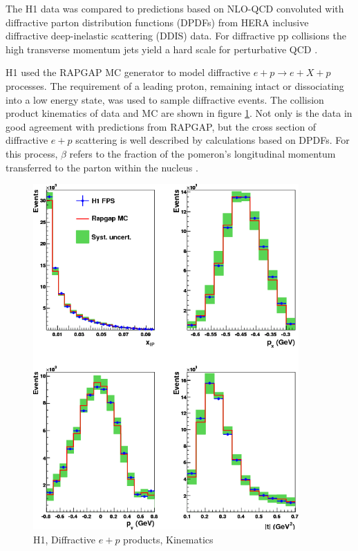 The H1 data was compared to predictions based on NLO-QCD convoluted with diffractive parton distribution functions (DPDFs) from HERA inclusive diffractive deep-inelastic scattering (DDIS) data. For diffractive pp collisions the high transverse momentum jets yield a hard scale for perturbative QCD \cite{Aaron:2010su}.

H1 used the RAPGAP MC generator to model diffractive $e+p \rightarrow e+X+p$ processes. The requirement of a leading proton, remaining intact or dissociating into a low energy state, was used to sample diffractive events. The collision product kinematics of data and MC are shown in figure \ref{fig:h1Kinematics}. Not only is the data in good agreement with predictions from RAPGAP, but the cross section of diffractive $e+p$ scattering is well described by calculations based on DPDFs. For this process, $\beta$ refers to the fraction of the pomeron's longitudinal momentum transferred to the parton within the nucleus \cite{Aaron:2010aa}. 

\begin{figure}[h!]
\begin{centering}
\includegraphics[width=4in]{Chapter2/importfigs/d10-095f3.png}
\par\end{centering}
\caption{H1, Diffractive $e+p$ products, Kinematics \cite{Aaron:2010aa} \label{fig:h1Kinematics}}
\end{figure}

